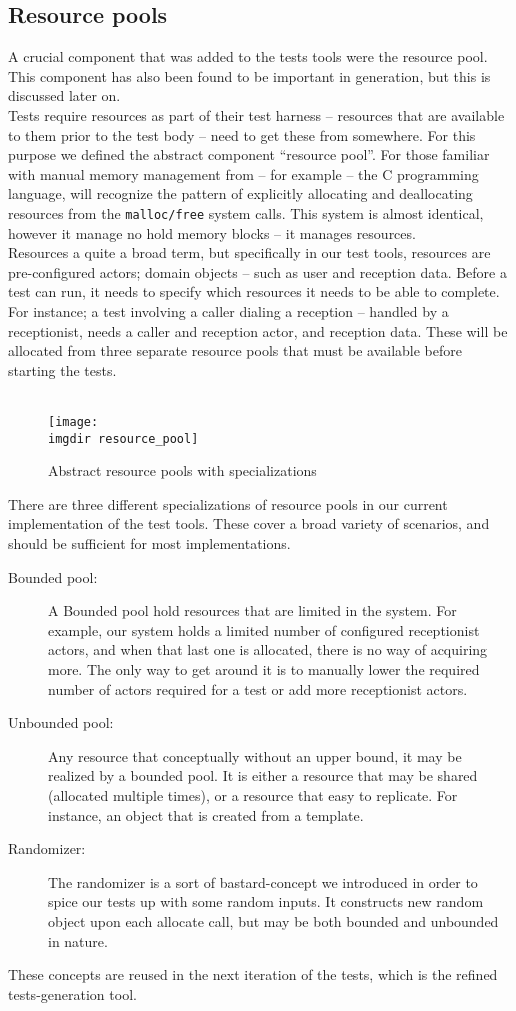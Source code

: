 \subsection{Resource pools}
\label{ssec:resource-pools}
A crucial component that was added to the tests tools were the resource pool. This component has also been found to be important in generation, but this is discussed later on.\\
Tests require resources as part of their test harness -- resources that are available to them prior to the test body -- need to get these from somewhere. For this purpose we defined the abstract component ``resource pool''. For those familiar with manual memory management from -- for example -- the C programming language, will recognize the pattern of explicitly allocating and deallocating resources from the \texttt{malloc/free} system calls. This system is almost identical, however it manage no hold memory blocks -- it manages resources.\\
Resources a quite a broad term, but specifically in our test tools, resources are pre-configured actors; domain objects -- such as user and reception data. Before a test can run, it needs to specify which resources it needs to be able to complete. For instance; a test involving a caller dialing a reception -- handled by a receptionist, needs a caller and reception actor, and reception data. These will be allocated from three separate resource pools that must be available before starting the tests.\\\\
\begin{figure}[!htbp]
\centering
\texttt{[image: \\imgdir resource\_pool]}
\caption{Abstract resource pools with specializations}
\label{fig:resource_pool}
\end{figure}There are three different specializations of resource pools in our current implementation of the test tools. These cover a broad variety of scenarios, and should be sufficient for most implementations.
\begin{description}
  \item[Bounded pool:] A Bounded pool hold resources that are limited in the system. For example, our system holds a limited number of configured receptionist actors, and when that last one is allocated, there is no way of acquiring more. The only way to get around it is to manually lower the required number of actors required for a test or add more receptionist actors.
  \item[Unbounded pool:] Any resource that conceptually without an upper bound, it may be realized by a bounded pool. It is either a resource that may be shared (allocated multiple times), or a resource that easy to replicate. For instance, an object that is created from a template.
  \item[Randomizer:] The randomizer is a sort of bastard-concept we introduced in order to spice our tests up with some random inputs. It constructs new random object upon each allocate call, but may be both bounded and unbounded in nature.
\end{description}
These concepts are reused in the next iteration of the tests, which is the refined tests-generation tool.

